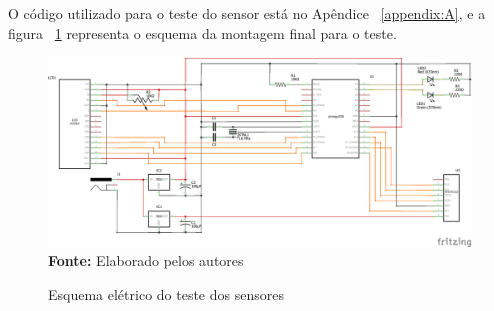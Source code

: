 O código utilizado para o teste do sensor está no Apêndice
~\ref{appendix:A}, e a figura ~\ref{fig:esquemasensores}
representa o esquema da montagem final para o teste.

\FloatBarrier
\begin{figure}[!htbp]
	\centering
	\caption{Esquema elétrico do teste dos sensores}
	\includegraphics[scale=.7]{imagens/esquemasensores}
	\\\textbf{Fonte:} Elaborado pelos autores
	\label{fig:esquemasensores}
\end{figure}
\FloatBarrier
